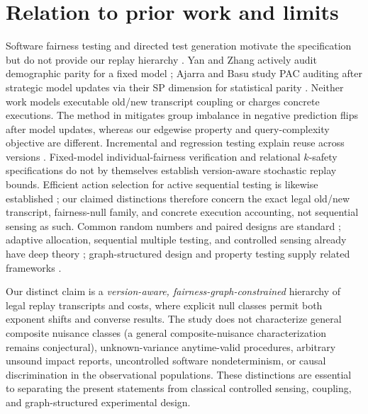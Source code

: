 \section{Relation to prior work and limits}
Software fairness testing and directed test generation motivate the specification but do not provide our replay hierarchy \cite{GalhotraBrunMeliou2017,UdeshiAroraChattopadhyay2018,ZhangEtAl2020,ChenEtAl2024}. Yan and Zhang actively audit demographic parity for a fixed model \cite{YanZhang2022}; Ajarra and Basu study PAC auditing after strategic model updates via their SP dimension for statistical parity \cite{AjarraBasu2026}. Neither work models executable old/new transcript coupling or charges concrete executions. The method in \cite{BuselliEtAl2024} mitigates group imbalance in negative prediction flips after model updates, whereas our edgewise property and query-complexity objective are different. Incremental and regression testing explain reuse across versions \cite{RothermelHarrold1996,YooHarman2012,LiSunLeungZhang2013,YinEtAl2025}. Fixed-model individual-fairness verification and relational $k$-safety specifications \cite{GeorgeJohnVijaykeerthySaha2020,ChristakisEtAl2023} do not by themselves establish version-aware stochastic replay bounds. Efficient action selection for active sequential testing is likewise established \cite{GanJiaLiTayur2026}; our claimed distinctions therefore concern the exact legal old/new transcript, fairness-null family, and concrete execution accounting, not sequential sensing as such. Common random numbers and paired designs are standard \cite{GlassermanYao1992,Connor1987,McNemar1947,NelsonMatejcik1995}; adaptive allocation, sequential multiple testing, and controlled sensing already have deep theory \cite{Chernoff1959,CohenZhao2015,NaghshvarJavidi2013,NitinawaratAtiaVeeravalli2013,DeshmukhVeeravalliBhashyam2021,MalekEtAl2017,MalloyNowak2014}; graph-structured design and property testing supply related frameworks \cite{SinghSinghDavidov2025,GoldreichGoldwasserRon1998,GoldreichRon1997,BlaisSeth2024,BunDesaiPinto2026,PintoPalitRaskhodnikova2026}.

Our distinct claim is a \emph{version-aware, fairness-graph-constrained} hierarchy of legal replay transcripts and costs, where explicit null classes permit both exponent shifts and converse results. The study does not characterize general composite nuisance classes (a general composite-nuisance characterization remains conjectural), unknown-variance anytime-valid procedures, arbitrary unsound impact reports, uncontrolled software nondeterminism, or causal discrimination in the observational populations. These distinctions are essential to separating the present statements from classical controlled sensing, coupling, and graph-structured experimental design.

